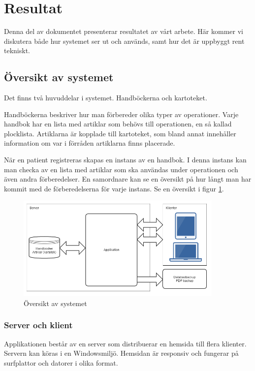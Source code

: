 \section{Resultat}
Denna del av dokumentet presenterar resultatet av vårt arbete.
Här kommer vi diskutera både hur systemet ser ut och används, samt hur
det är uppbyggt rent tekniskt.

\subsection{Översikt av systemet}
Det finns två huvuddelar i systemet. Handböckerna och kartoteket.

Handböckerna beskriver hur man förbereder olika typer av operationer.
Varje handbok har en lista med artiklar som behövs till operationen, en så kallad plocklista.
Artiklarna är kopplade till kartoteket, som bland annat innehåller information om var i förråden artiklarna finns placerade.

När en patient registreras skapas en instans av en handbok.
I denna instans kan man checka av en lista med artiklar som ska användas under operationen och även andra förberedelser.
En samordnare kan se en översikt på hur långt man har kommit med de förberedelserna för varje instans.
Se en översikt i figur \ref{fig:overview}.

\begin{figure}
  \centering
  \includegraphics[width=0.9\textwidth]{images/overview.png}
  \caption{Översikt av systemet}
  \label{fig:overview}
\end{figure}

\subsubsection{Server och klient}
Applikationen består av en server som distribuerar en hemsida till flera klienter.
Servern kan köras i en Windowsmiljö.
Hemsidan är responsiv och fungerar på surfplattor och datorer i olika format.

